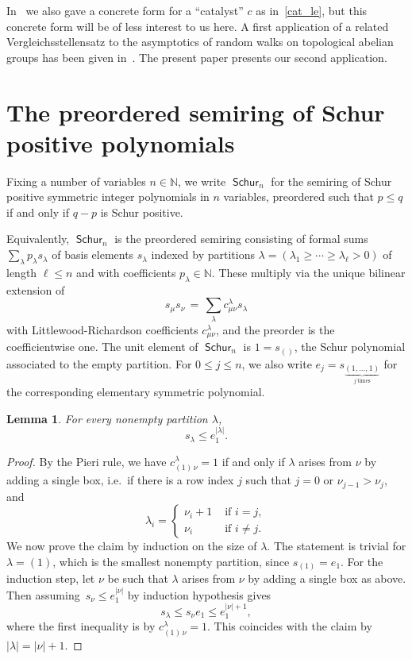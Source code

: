 \documentclass[11pt]{article}
\newtheorem{lemm}[theo]{Lemma}
\theoremstyle{definition}
\providecommand{\ie}{i.e.\ }
\numberwithin{equation}{section}
\newcommand{\N}{\mathbb{N}}
\DeclareMathOperator{\Schur}{\mathsf{Schur}}
\begin{document}
In~\cite{vergleichsstellensatz} we also gave a concrete form for a ``catalyst'' $c$ as in~\eqref{cat_le}, but this concrete form will be of less interest to us here.
A first application of a related Vergleichsstellensatz to the asymptotics of random walks on topological abelian groups has been given in~\cite{random_walks}.
The present paper presents our second application.

\section{The preordered semiring of Schur positive polynomials}
\label{sec_schur}

Fixing a number of variables $n \in \N$, we write $\Schur_n$ for the semiring of Schur positive symmetric integer polynomials in $n$ variables, preordered such that $p \le q$ if and only if $q - p$ is Schur positive.

Equivalently, $\Schur_n$ is the preordered semiring consisting of formal sums $\sum_\lambda p_\lambda s_\lambda$ of basis elements $s_\lambda$ indexed by partitions $\lambda = (\lambda_1 \ge \cdots \ge \lambda_\ell > 0)$ of length $\ell \le n$ and with coefficients $p_\lambda \in \N$. These multiply via the unique bilinear extension of
\begin{equation}
	\label{LR_mult}
	s_\mu s_\nu \,=\, \sum_\lambda c^\lambda_{\mu\nu} s_\lambda
\end{equation}
with Littlewood-Richardson coefficients $c^\lambda_{\mu\nu}$, and the preorder is the coefficientwise one.
The unit element of $\Schur_n$ is $1 = s_{()}$, the Schur polynomial associated to the empty partition.
For $0 \le j \le n$, we also write $e_j = s_{\underbrace{\scriptstyle{(1,\ldots,1)}}_{j\:\mathrm{times}}}$ for the corresponding elementary symmetric polynomial.

\begin{lemm}
	\label{schur_bound}
	For every nonempty partition $\lambda$,
	\[
		s_\lambda \le e_1^{|\lambda|}.
	\]
\end{lemm}

\begin{proof}
	By the Pieri rule, we have $c^\lambda_{(1)\, \nu} = 1$ if and only if $\lambda$ arises from $\nu$ by adding a single box, \ie{}if there is a row index $j$ such that $j = 0$ or $\nu_{j-1} > \nu_j$, and
	\[
		\lambda_i = \begin{cases}	\nu_i + 1 & \textrm{ if } i = j, \\
						\nu_i & \textrm{ if } i \neq j. \end{cases}
	\]
	We now prove the claim by induction on the size of $\lambda$.
	The statement is trivial for $\lambda = (1)$, which is the smallest nonempty partition, since $s_{(1)} = e_1$.
	For the induction step, let $\nu$ be such that $\lambda$ arises from $\nu$ by adding a single box as above.
	Then assuming~$s_\nu \le e_1^{|\nu|}$ by induction hypothesis gives
	\[
		s_\lambda \le s_\nu e_1 \le e_1^{|\nu|+1},
	\]
	where the first inequality is by $c^\lambda_{(1)\, \nu} = 1$.
	This coincides with the claim by $|\lambda| = |\nu| + 1$.
\end{proof}
\end{document}
